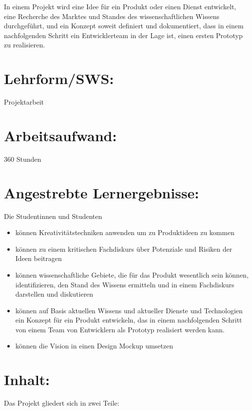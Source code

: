 In einem Projekt wird eine Idee für ein Produkt oder einen Dienst
entwickelt, eine Recherche des Marktes und Standes des
wissenschaftlichen Wissens durchgeführt, und ein Konzept soweit
definiert und dokumentiert, dass in einem nachfolgenden Schritt ein
Entwicklerteam in der Lage ist, einen ersten Prototyp zu realisieren.

\section*{Lehrform/SWS:}\label{lehrformsws-10}

Projektarbeit

\section*{Arbeitsaufwand:}\label{arbeitsaufwand-16}

360 Stunden

\section*{Angestrebte
Lernergebnisse:}\label{angestrebte-lernergebnisse-10}

Die Studentinnen und Studenten

\begin{itemize}
\tightlist
\item
  können Kreativitätstechniken anwenden um zu Produktideen zu kommen
\item
  können zu einem kritischen Fachdiskurs über Potenziale und Risiken der
  Ideen beitragen
\item
  können wissenschaftliche Gebiete, die für das Produkt wesentlich sein
  können, identifizieren, den Stand des Wissens ermitteln und in einem
  Fachdiskurs darstellen und diskutieren
\item
  können auf Basis aktuellen Wissens und aktueller Dienste und
  Technologien ein Konzept für ein Produkt entwickeln, das in einem
  nachfolgenden Schritt von einem Team von Entwicklern als Prototyp
  realisiert werden kann.
\item
  können die Vision in einen Design Mockup umsetzen
\end{itemize}

\section*{Inhalt:}\label{inhalt-10}

Das Projekt gliedert sich in zwei Teile:

